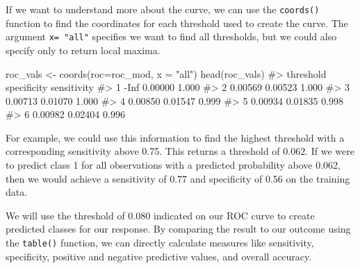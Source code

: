 \documentclass[
  letterpaper,
]{krantz}
\makeatletter
\newenvironment{Shaded}{\begin{snugshade}}{\end{snugshade}}
\newcommand{\AttributeTok}[1]{\textcolor[rgb]{0.40,0.45,0.13}{#1}}
\newcommand{\CommentTok}[1]{\textcolor[rgb]{0.37,0.37,0.37}{#1}}
\newcommand{\DecValTok}[1]{\textcolor[rgb]{0.68,0.00,0.00}{#1}}
\newcommand{\FloatTok}[1]{\textcolor[rgb]{0.68,0.00,0.00}{#1}}
\newcommand{\FunctionTok}[1]{\textcolor[rgb]{0.28,0.35,0.67}{#1}}
\newcommand{\NormalTok}[1]{\textcolor[rgb]{0.00,0.23,0.31}{#1}}
\newcommand{\OtherTok}[1]{\textcolor[rgb]{0.00,0.23,0.31}{#1}}
\newcommand{\SpecialCharTok}[1]{\textcolor[rgb]{0.37,0.37,0.37}{#1}}
\newcommand{\StringTok}[1]{\textcolor[rgb]{0.13,0.47,0.30}{#1}}
\newenvironment{kframe}{%
\medskip{}
\setlength{\fboxsep}{.8em}
 \def\at@end@of@kframe{}%
 \ifinner\ifhmode%
  \def\at@end@of@kframe{\end{minipage}}%
  \begin{minipage}{\columnwidth}%
 \fi\fi%
 \def\FrameCommand##1{\hskip\@totalleftmargin \hskip-\fboxsep
 \colorbox{shadecolor}{##1}\hskip-\fboxsep
     \hskip-\linewidth \hskip-\@totalleftmargin \hskip\columnwidth}%
 \MakeFramed {\advance\hsize-\width
   \@totalleftmargin\z@ \linewidth\hsize
   \@setminipage}}%
 {\par\unskip\endMakeFramed%
 \at@end@of@kframe}
\renewenvironment{Shaded}{\begin{kframe}}{\end{kframe}}
\makeatother
\begin{document}
If we want to understand more about the curve, we can use the
\texttt{coords()} function to find the coordinates for each threshold
used to create the curve. The argument \texttt{x=\ "all"} specifies we
want to find all thresholds, but we could also specify only to return
local maxima.

\begin{Shaded}
\begin{Highlighting}[]
\NormalTok{roc\_vals }\OtherTok{\textless{}{-}} \FunctionTok{coords}\NormalTok{(}\AttributeTok{roc=}\NormalTok{roc\_mod, }\AttributeTok{x =} \StringTok{"all"}\NormalTok{)}
\FunctionTok{head}\NormalTok{(roc\_vals)}
\CommentTok{\#\textgreater{}   threshold specificity sensitivity}
\CommentTok{\#\textgreater{} 1      {-}Inf     0.00000       1.000}
\CommentTok{\#\textgreater{} 2   0.00569     0.00523       1.000}
\CommentTok{\#\textgreater{} 3   0.00713     0.01070       1.000}
\CommentTok{\#\textgreater{} 4   0.00850     0.01547       0.999}
\CommentTok{\#\textgreater{} 5   0.00934     0.01835       0.998}
\CommentTok{\#\textgreater{} 6   0.00982     0.02404       0.996}
\end{Highlighting}
\end{Shaded}

For example, we could use this information to find the highest threshold
with a corresponding sensitivity above 0.75. This returns a threshold of
0.062. If we were to predict class 1 for all observations with a
predicted probability above 0.062, then we would achieve a sensitivity
of 0.77 and specificity of 0.56 on the training data.

\begin{Shaded}
\end{Shaded}

We will use the threshold of 0.080 indicated on our ROC curve to create
predicted classes for our response. By comparing the result to our
outcome using the \texttt{table()} function, we can directly calculate
measures like sensitivity, specificity, positive and negative predictive
values, and overall accuracy.
\end{document}
